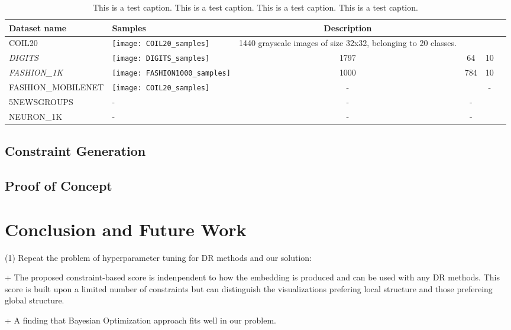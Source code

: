 \begin{table*}[width=\textwidth,cols=6,pos=h]
\caption{This is a test caption. This is a test caption. This is a test
caption. This is a test caption.}\label{tbl1}
\begin{tabular}{m{3cm} m{4.5cm} ccc m{4.5cm}}
\toprule
Dataset name & Samples & Description \\
\midrule
COIL20
    & \texttt{[image: COIL20\_samples]}
    & 1440 grayscale images of size 32x32, belonging to 20 classes.\\
\emph{DIGITS}
    & \texttt{[image: DIGITS\_samples]}
    & 1797 & 64 & 10\\
\emph{FASHION\_1K}
    & \texttt{[image: FASHION1000\_samples]}
    & 1000 & 784 & 10\\
FASHION\_MOBILENET
    & \texttt{[image: COIL20\_samples]}
    & - &  & - \\

5NEWSGROUPS & - & - & - \\

NEURON\_1K & - & - & - \\
\bottomrule
\end{tabular}
\end{table*}


\subsection{Constraint Generation}


\subsection{Proof of Concept}

\section{Conclusion and Future Work}

\par (1) Repeat the problem of hyperparameter tuning for DR methods and our solution:

+ The proposed constraint-based score is indenpendent to how the embedding is produced and can be used with any DR methods.
This score is built upon a limited number of constraints but can distinguish the visualizations prefering local structure and those prefereing global structure.

+ A finding that Bayesian Optimization approach fits well in our problem.


